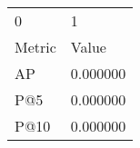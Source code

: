 \begin{tabular}{ll}
0 & 1 \\
Metric & Value \\
AP & 0.000000 \\
P@5 & 0.000000 \\
P@10 & 0.000000 \\
\end{tabular}
